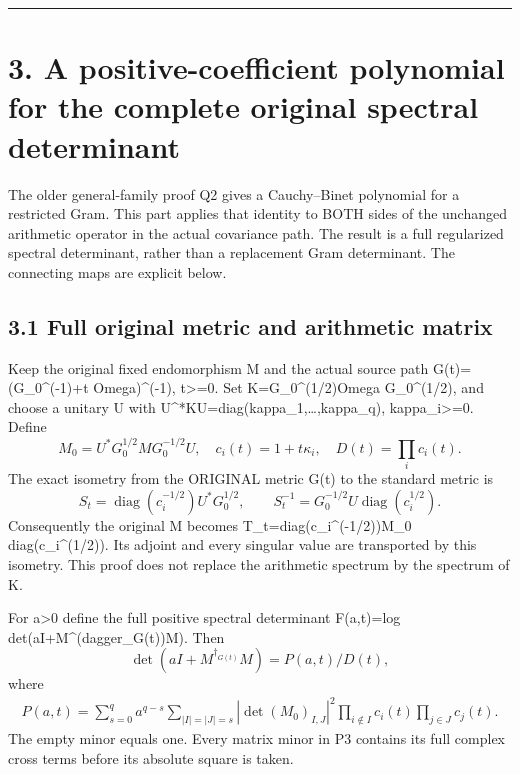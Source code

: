 \begin{center}\rule{0.5\linewidth}{0.5pt}\end{center}

\section{3. A positive-coefficient polynomial for the complete original spectral determinant}\label{a-positive-coefficient-polynomial-for-the-complete-original-spectral-determinant}

The older general-family proof Q2 gives a Cauchy--Binet polynomial for a restricted Gram. This part applies that identity to BOTH sides of the unchanged arithmetic operator in the actual covariance path. The result is a full regularized spectral determinant, rather than a replacement Gram determinant. The connecting maps are explicit below.

\subsection{3.1 Full original metric and arithmetic matrix}\label{full-original-metric-and-arithmetic-matrix}

Keep the original fixed endomorphism M and the actual source path G(t)=(G\_0\^{}(-1)+t Omega)\^{}(-1), t\textgreater=0. Set K=G\_0\^{}(1/2)Omega G\_0\^{}(1/2), and choose a unitary U with U\^{}*KU=diag(kappa\_1,\ldots,kappa\_q), kappa\_i\textgreater=0. Define \[
 M_0=U^*G_0^{1/2}M G_0^{-1/2}U,\quad
 c_i(t)=1+t\kappa_i,\quad D(t)=\prod_i c_i(t).
 \tag{P1}
\] The exact isometry from the ORIGINAL metric G(t) to the standard metric is \[
 S_t=\operatorname{diag}(c_i^{-1/2})U^*G_0^{1/2},\qquad
 S_t^{-1}=G_0^{-1/2}U\operatorname{diag}(c_i^{1/2}).
\] Consequently the original M becomes T\_t=diag(c\_i\^{}(-1/2))M\_0 diag(c\_i\^{}(1/2)). Its adjoint and every singular value are transported by this isometry. This proof does not replace the arithmetic spectrum by the spectrum of K.

For a\textgreater0 define the full positive spectral determinant F(a,t)=log det(aI+M\^{}(dagger\_G(t))M). Then \[
 \boxed{\det(aI+M^{\dagger_{G(t)}}M)=P(a,t)/D(t),}\tag{P2}
\] where \[
 \boxed{\begin{aligned}
 P(a,t)=\sum_{s=0}^q a^{q-s}
 \sum_{|I|=|J|=s}
 |\det(M_0)_{I,J}|^2
 \prod_{i\notin I}c_i(t)\prod_{j\in J}c_j(t).
 \end{aligned}}\tag{P3}
\] The empty minor equals one. Every matrix minor in P3 contains its full complex cross terms before its absolute square is taken.

